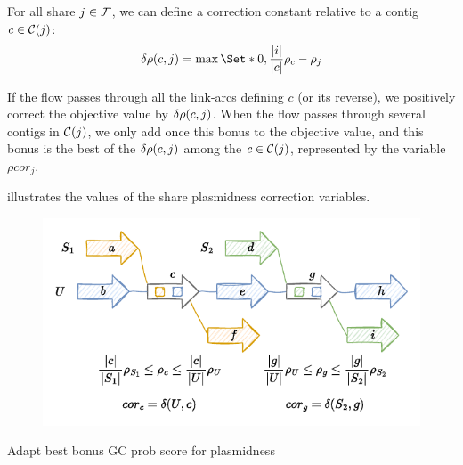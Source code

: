 For all share \(j \in \mathcal{F}{}\), we can define a correction constant relative to a contig \(c \in \mathcal{C}(j)\):
\[
  \dplm{c}{j} = \max \Set*{0, \frac{ |i| }{ |c| }\plm{c} - \plm{j}}
\]

If the flow passes through all the link-arcs defining \(c\) (or its reverse), we positively correct the objective value by \(\delta\rho(c, j)\).
When the flow passes through several contigs in \(\mathcal{C}(j)\), we only add once this bonus to the objective value, and this bonus is the best of the \(\delta\rho(c, j)\) among the \(c \in \mathcal{C}(j)\), represented by the variable \(\rho cor_j\).

 illustrates the values of the share plasmidness correction variables.

\begin{figure}[htb]
  \centering
  \includegraphics[width=0.6\linewidth]{appendix/ideas/asmcons_milp_fine_tuning/img/constraints-correct_plasmidness_example.pdf}
  \label{fig:correct_share_plasmidness}
\end{figure}

\begin{todobox}
  Adapt best bonus GC prob score for plasmidness
\end{todobox}